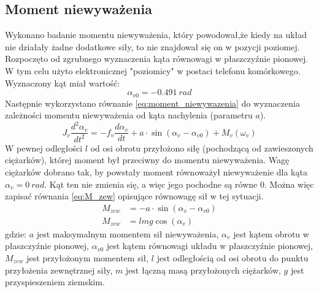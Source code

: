 \documentclass[11pt,a4paper]{article}
\begin{document}
\subsection{Moment niewyważenia}
Wykonano badanie momentu niewyważenia, który powodował,że kiedy na układ nie działały żadne dodatkowe siły, to nie znajdował się on w pozycji poziomej. Rozpoczęto od zgrubnego wyznaczenia kąta równowagi w płaszczyźnie pionowej. W tym celu użyto elektronicznej "poziomicy" w postaci telefonu komórkowego. Wyznaczony kąt miał wartość:
\begin{equation}
\alpha_{v0} = -0.491 \ rad
\end{equation}
Następnie wykorzystano równanie \eqref{eq:moment_niewywazenia} do wyznaczenia zależności momentu niewyważenia od kąta nachylenia (parametru \(a\)).
\begin{equation}
J_v \frac{d^2\alpha_v}{dt^2} = -f_v\frac{d\alpha_v}{dt}+a\cdot \sin(\alpha_v-\alpha_{v0})+M_v(\omega_v)
\label{eq:moment_niewywazenia}
\end{equation}
W pewnej odległości \(l\) od osi obrotu przyłożono siłę (pochodzącą od zawieszonych ciężarków), której moment był przeciwny do momentu niewyważenia. Wagę ciężarków dobrano tak, by powstały moment równoważył niewyważenie dla kąta \(\alpha_v=0 \ rad \). Kąt ten nie zmienia się, a więc jego pochodne są równe \(0\). Można więc zapisać równania \eqref{eq:M_zew} opisujące równowagę sił w tej sytuacji.
\begin{equation}
\begin{aligned}
M_{zew} &= -a\cdot \sin(\alpha_v-\alpha_{v0})\\
M_{zew} &= lmg\cos(\alpha_v)
\end{aligned}
\label{eq:M_zew}
\end{equation}
\noindent gdzie:\newline
\(a\) jest maksymalnym momentem sił niewyważenia,\newline
\(\alpha_v\) jest kątem obrotu w płaszczyźnie pionowej,\newline
\(\alpha_{v0}\) jest kątem równowagi układu w płaszczyźnie pionowej,\newline
\(M_{zew}\) jest przyłożonym momentem sił,\newline
\(l\) jest odległością od osi obrotu do punktu przyłożenia zewnętrznej siły,\newline
\(m\) jest łączną masą przyłożonych ciężarków,\newline
\(g\) jest przyspieszeniem ziemskim.
\end{document}
